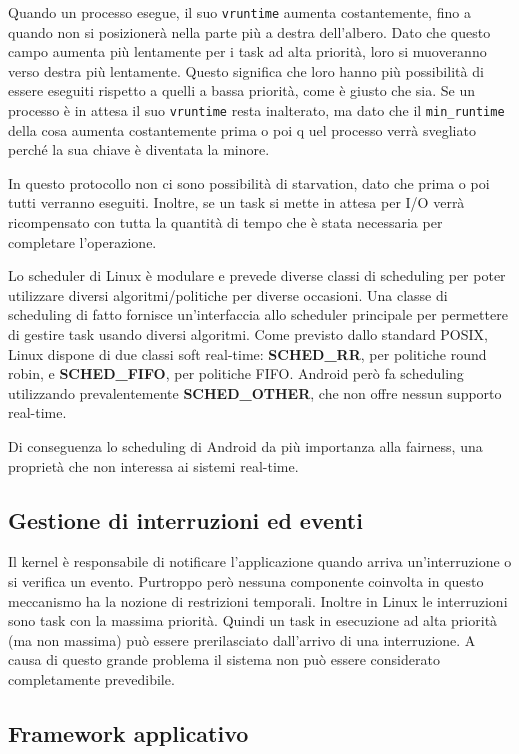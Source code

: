 Quando un processo esegue, il suo \texttt{vruntime} aumenta costantemente, fino a quando non si posizionerà nella parte più a destra dell'albero. Dato che questo campo aumenta più lentamente per i task ad alta priorità, loro si muoveranno verso destra più lentamente. Questo significa che loro hanno più possibilità di essere eseguiti rispetto a quelli a bassa priorità, come è giusto che sia. Se un processo è in attesa il suo \texttt{vruntime} resta inalterato, ma dato che il \texttt{min\_runtime} della cosa aumenta costantemente prima o poi q	uel processo verrà svegliato perché la sua chiave è diventata la minore. 

In questo protocollo non ci sono possibilità di starvation, dato che prima o poi tutti verranno eseguiti. Inoltre, se un task si mette in attesa per I/O verrà ricompensato con tutta la quantità di tempo che è stata necessaria per completare l'operazione. 

Lo scheduler di Linux è modulare e prevede diverse classi di scheduling per poter utilizzare diversi algoritmi/politiche per diverse occasioni. Una classe di scheduling di fatto fornisce un'interfaccia allo scheduler principale per permettere di gestire task usando diversi algoritmi. Come previsto dallo standard POSIX, Linux dispone di due classi soft real-time: \textbf{SCHED\_RR}, per politiche round robin, e \textbf{SCHED\_FIFO}, per politiche FIFO. Android però fa scheduling utilizzando prevalentemente \textbf{SCHED\_OTHER}, che non offre nessun supporto real-time.

Di conseguenza lo scheduling di Android da più importanza alla fairness, una proprietà che non interessa ai sistemi real-time. 

\subsection{Gestione di interruzioni ed eventi}
Il kernel è responsabile di notificare l'applicazione quando arriva un'interruzione o si verifica un evento. Purtroppo però nessuna componente coinvolta in questo meccanismo ha la nozione di restrizioni temporali. Inoltre in Linux le interruzioni sono task con la massima priorità. Quindi un task in esecuzione ad alta priorità (ma non massima) può essere prerilasciato dall'arrivo di una interruzione. A causa di questo grande problema il sistema non può essere considerato completamente prevedibile.

\subsection{Framework applicativo}
